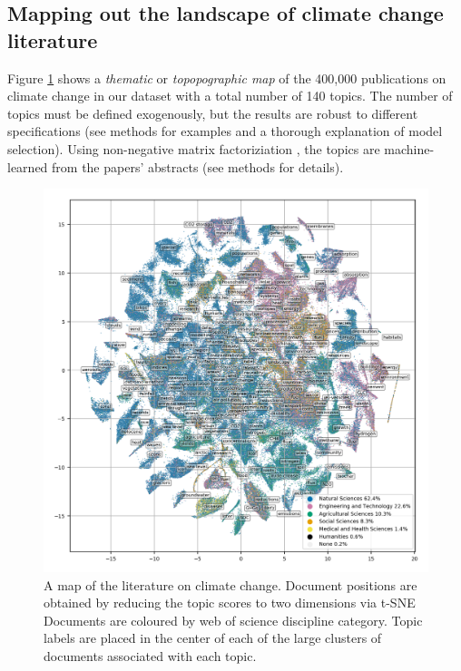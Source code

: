\documentclass{article}
\begin{document}
\begin{linenumbers}
		
		\subsection*{Mapping out the landscape of climate change literature}
		
		Figure \ref{oecd_topic_map} shows a \emph{thematic} or \emph{topopographic map} of the 400,000 publications on climate change in our dataset with a total number of 140 topics. The number of topics must be defined exogenously, but the results are robust to different specifications (see methods for examples and a thorough explanation of model selection). Using non-negative matrix factoriziation \cite{Lee1999}, the topics are machine-learned from the papers' abstracts (see methods for details). 
		
		
		\begin{figure}[htp]
			\begin{center}
				\includegraphics[width=180mm]{plots_pub/all_topic_words_oecds.png}
				\caption{A map of the literature on climate change. Document positions are obtained by reducing the topic scores to two dimensions via t-SNE Documents are coloured by web of science discipline category. Topic labels are placed in the center of each of the large clusters of documents associated with each topic. }
				\label{oecd_topic_map}
			\end{center}
		\end{figure}
		

\end{linenumbers}
\end{document}
